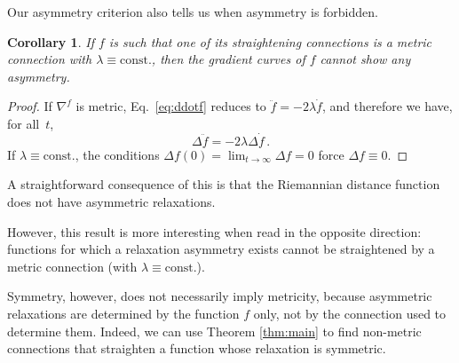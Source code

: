 \documentclass{amsart}
\newtheorem{corollary}[theorem]{Corollary}
\theoremstyle{definition}
\begin{document}
Our asymmetry criterion also tells us when asymmetry is forbidden. 
    \begin{corollary}
     If $f$ is such that one of its straightening connections is a metric connection with $\lambda\equiv\text{const.}$, 
     then the gradient curves of $f$ cannot show any asymmetry.
    \end{corollary}
    \begin{proof}
        If 
$\nabla^f$ is metric, Eq.~\eqref{eq:ddotf} reduces to
$\ddot f=-2\lambda\dot f$, and therefore we have, for all~$t$,
\begin{equation*}
    \Delta\ddot f=-2\lambda\Delta\dot f\,.
\end{equation*}
If $\lambda\equiv\text{const.}$, the conditions $\Delta f(0)=\lim_{t\to\infty}\Delta f=0$ force $\Delta f\equiv0$. 
    \end{proof}

A straightforward consequence of this is that the Riemannian distance function does not have asymmetric relaxations.

However, this result is more interesting when read in the opposite direction:
functions for which a relaxation asymmetry exists
cannot be straightened by a metric connection (with $\lambda\equiv\text{const.}$).

Symmetry, however, does not necessarily
imply metricity, because asymmetric relaxations are determined by the function $f$ only,
not by the connection used to determine them.
Indeed, we can use Theorem \ref{thm:main} to find non-metric connections
that straighten a function whose relaxation is symmetric.

\end{document}
